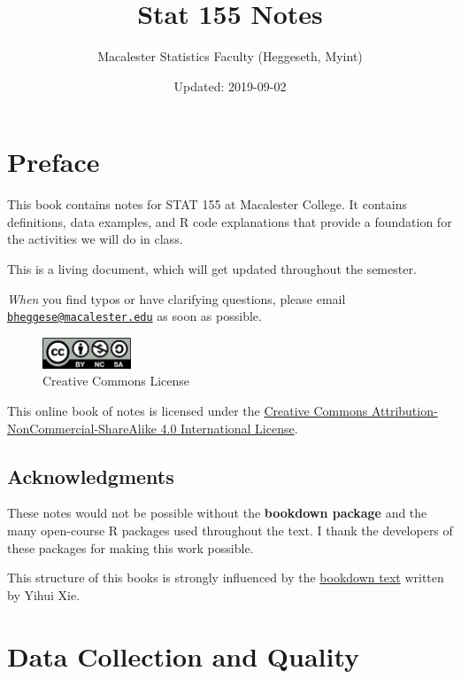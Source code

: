 \documentclass[]{book}
\title{Stat 155 Notes}
\author{Macalester Statistics Faculty (Heggeseth, Myint)}
\date{Updated: 2019-09-02}
\begin{document}
\maketitle

{
\setcounter{tocdepth}{2}
\tableofcontents
}
\hypertarget{preface}{%
\chapter*{Preface}\label{preface}}


This book contains notes for STAT 155 at Macalester College. It contains definitions, data examples, and R code explanations that provide a foundation for the activities we will do in class.

This is a living document, which will get updated throughout the semester.

\emph{When} you find typos or have clarifying questions, please email \href{mailto:bheggese@macalester.edu}{\nolinkurl{bheggese@macalester.edu}} as soon as possible.

\begin{figure}
\centering
\includegraphics[width=1.04167in,height=\textheight]{Photos/by-nc-sa.png}
\caption{Creative Commons License}
\end{figure}

This online book of notes is licensed under the \href{http://creativecommons.org/licenses/by-nc-sa/4.0/}{Creative Commons Attribution-NonCommercial-ShareAlike 4.0 International License}.

\hypertarget{acknowledgments}{%
\section{Acknowledgments}\label{acknowledgments}}

These notes would not be possible without the \textbf{bookdown package} and the many open-course R packages used throughout the text. I thank the developers of these packages for making this work possible.

This structure of this books is strongly influenced by the \href{https://bookdown.org/yihui/bookdown}{bookdown text} written by Yihui Xie.

\hypertarget{data-collection-and-quality}{%
\chapter{Data Collection and Quality}\label{data-collection-and-quality}}
\end{document}
